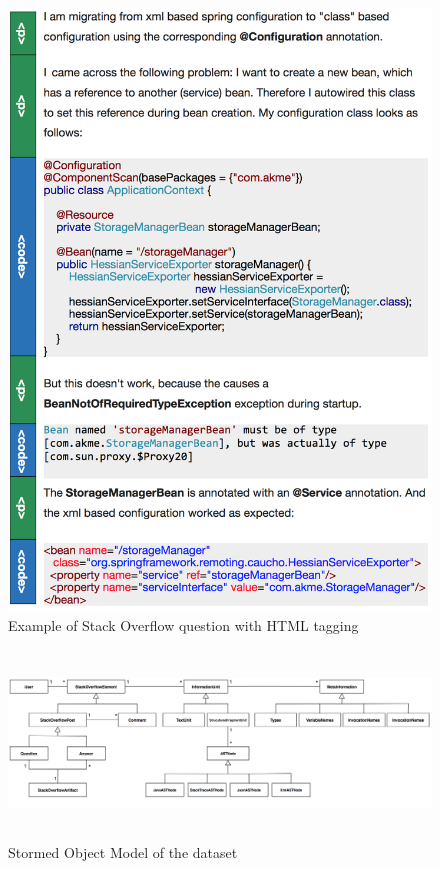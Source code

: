 \documentclass[12pt,mscthesis]{usiinfthesis}
\begin{document}
	\begin{figure}[htbp]
	 \centering
	\includegraphics[width=\textwidth]{stackOverflow}
	\caption{Example of Stack Overflow question with HTML tagging}
	\label{stackOverflow}
	\end{figure}

	\begin{figure}[htbp]
	\centering
	\includegraphics[width=\textwidth,height=5cm]{stormed}
	\caption{Stormed Object Model of the dataset}
	\label{stormed}
	\end{figure}
\end{document}

